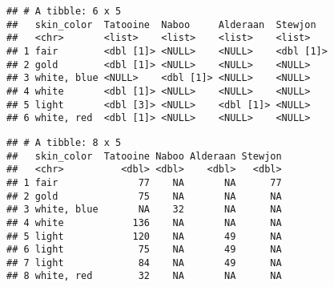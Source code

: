 \documentclass[]{book}
\newenvironment{Shaded}{\begin{snugshade}}{\end{snugshade}}
\newcommand{\DataTypeTok}[1]{\textcolor[rgb]{0.13,0.29,0.53}{#1}}
\newcommand{\DecValTok}[1]{\textcolor[rgb]{0.00,0.00,0.81}{#1}}
\newcommand{\KeywordTok}[1]{\textcolor[rgb]{0.13,0.29,0.53}{\textbf{#1}}}
\newcommand{\NormalTok}[1]{#1}
\newcommand{\OperatorTok}[1]{\textcolor[rgb]{0.81,0.36,0.00}{\textbf{#1}}}
\newcommand{\StringTok}[1]{\textcolor[rgb]{0.31,0.60,0.02}{#1}}
\begin{document}
\begin{Shaded}
\end{Shaded}

\begin{verbatim}
## # A tibble: 6 x 5
##   skin_color  Tatooine  Naboo     Alderaan  Stewjon  
##   <chr>       <list>    <list>    <list>    <list>   
## 1 fair        <dbl [1]> <NULL>    <NULL>    <dbl [1]>
## 2 gold        <dbl [1]> <NULL>    <NULL>    <NULL>   
## 3 white, blue <NULL>    <dbl [1]> <NULL>    <NULL>   
## 4 white       <dbl [1]> <NULL>    <NULL>    <NULL>   
## 5 light       <dbl [3]> <NULL>    <dbl [1]> <NULL>   
## 6 white, red  <dbl [1]> <NULL>    <NULL>    <NULL>
\end{verbatim}

\begin{Shaded}
\end{Shaded}

\begin{verbatim}
## # A tibble: 8 x 5
##   skin_color  Tatooine Naboo Alderaan Stewjon
##   <chr>          <dbl> <dbl>    <dbl>   <dbl>
## 1 fair              77    NA       NA      77
## 2 gold              75    NA       NA      NA
## 3 white, blue       NA    32       NA      NA
## 4 white            136    NA       NA      NA
## 5 light            120    NA       49      NA
## 6 light             75    NA       49      NA
## 7 light             84    NA       49      NA
## 8 white, red        32    NA       NA      NA
\end{verbatim}
\end{document}
